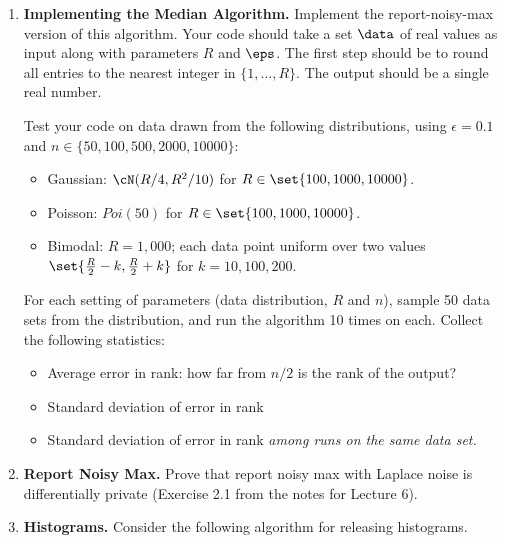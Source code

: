 \documentclass[11pt]{article}
\begin{document}
\begin{enumerate}[leftmargin=\parindent, itemsep=3ex]
\begin{enumerate}
        \end{enumerate}

          \item \textbf{Implementing the Median Algorithm.} Implement the report-noisy-max version of this
            algorithm. Your code should take a set $\data$ of real
            values as input along with parameters $R$ and $\eps$. The
            first step should be to round all entries to the nearest
            integer in $\{1,...,R\}$. The output should be a single
            real number.

           Test your code on data drawn from the following
           distributions, using $\epsilon = 0.1$ and $n \in \{50,100,500, 2000, 10000\}$:
           \begin{itemize}
           \item Gaussian: $\cN(R/4, R^2/10)$ for $R \in
             \set{100,1000,10000}$.
           \item Poisson: $\textit{Poi}(50)$ for $R \in 
             \set{100,1000,10000}$.
           \item Bimodal: $R=1,000$; each data point uniform over two
             values $\set{\frac{R}{2}-k, \frac{R}{2}+k}$ for $k = 10, 100, 200$.
             \end{itemize}
             For each setting of parameters (data distribution, $R$
             and $n$), sample 50 data sets from the distribution, and
             run the algorithm 10 times on each. Collect the following
             statistics:
             \begin{itemize}
             \item Average error in rank: how far from $n/2$ is the
               rank of the output?
             \item Standard deviation of error in rank
             \item Standard deviation of error in rank \emph{among runs on
               the same data set.}
           \end{itemize}

         
        
\item \textbf{Report Noisy Max.} Prove that report noisy max with Laplace noise is differentially
  private (Exercise 2.1 from the notes for Lecture 6).

\item         \textbf{Histograms.}
  Consider the following algorithm for releasing histograms.
  

\end{enumerate}
\end{document}
